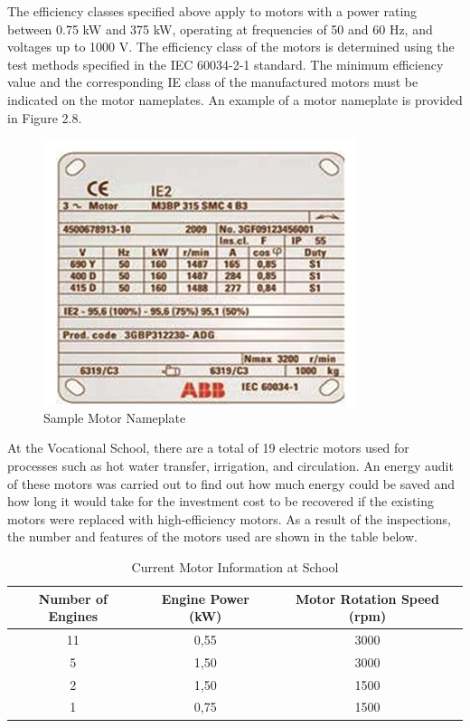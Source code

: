 The efficiency classes specified above apply to motors with a power rating between 0.75 kW and 375 kW, operating at frequencies of 50 and 60 Hz, and voltages up to 1000 V. The efficiency class of the motors is determined using the test methods specified in the IEC 60034-2-1 standard. The minimum efficiency value and the corresponding IE class of the manufactured motors must be indicated on the motor nameplates. An example of a motor nameplate is provided in Figure 2.8.

\begin{figure}[H]
    \centering
    \includegraphics[width=0.6\columnwidth]{imgs/motor etiket resmi.png}
    \caption[Short description for list of figures]{Sample Motor Nameplate }
    \label{fig-magnitude}
    \end{figure}%

At the Vocational School, there are a total of 19 electric motors used for processes such as hot water transfer, irrigation, and circulation. An energy audit of these motors was carried out to find out how much energy could be saved and how long it would take for the investment cost to be recovered if the existing motors were replaced with high-efficiency motors. As a result of the inspections, the number and features of the motors used are shown in the table below.

\begin{table}[h!]
\centering
\begin{tabular}{|c|c|c|}
\hline
\textbf{Number of Engines} & \textbf{Engine Power (kW)} & \textbf{Motor Rotation Speed (rpm)} \\ \hline
11 & 0,55 & 3000 \\ \hline
5  & 1,50 & 3000 \\ \hline
2  & 1,50 & 1500 \\ \hline
1  & 0,75 & 1500 \\ \hline
\end{tabular}
\caption{Current Motor Information at School}
\end{table}

